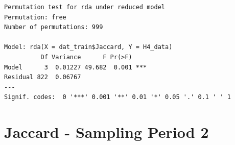 \documentclass[
  letterpaper,
  DIV=11,
  numbers=noendperiod]{scrreprt}
\newenvironment{Shaded}{\begin{snugshade}}{\end{snugshade}}
\newcommand{\CommentTok}[1]{\textcolor[rgb]{0.37,0.37,0.37}{#1}}
\newcommand{\FunctionTok}[1]{\textcolor[rgb]{0.28,0.35,0.67}{#1}}
\newcommand{\NormalTok}[1]{\textcolor[rgb]{0.00,0.23,0.31}{#1}}
\newcommand{\SpecialCharTok}[1]{\textcolor[rgb]{0.37,0.37,0.37}{#1}}
\begin{document}
\begin{Shaded}
\end{Shaded}

\begin{verbatim}
Permutation test for rda under reduced model
Permutation: free
Number of permutations: 999

Model: rda(X = dat_train$Jaccard, Y = H4_data)
          Df Variance      F Pr(>F)    
Model      3  0.01227 49.682  0.001 ***
Residual 822  0.06767                  
---
Signif. codes:  0 '***' 0.001 '**' 0.01 '*' 0.05 '.' 0.1 ' ' 1
\end{verbatim}

\section{Jaccard - Sampling Period 2}
\end{document}
